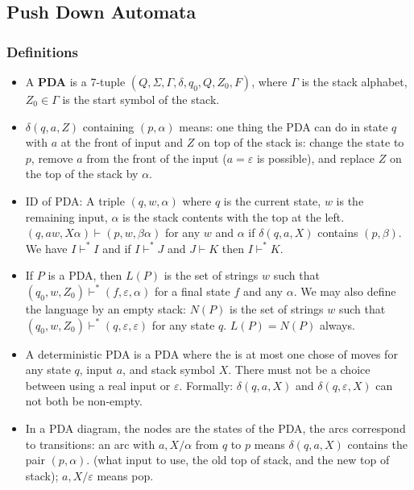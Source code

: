 \subsection{\color{ForestGreen}Push Down Automata}
\subsubsection{Definitions}
\begin{itemize}
\item A \textbf{PDA} is a 7-tuple \( (Q, \Sigma, \Gamma, \delta , q_0, Q, Z_0, F ) \), where \( \Gamma \) is the stack alphabet, \( Z_0 \in \Gamma \) is the start symbol of the stack. 
\item \( \delta (q, a, Z) \) containing \( (p, \alpha) \) means: one thing the PDA can do in state \( q \) with \( a \) at the front of input and \( Z \) on top of the stack is: change the state to \( p \), remove \( a \) from the front of the input (\( a = \varepsilon  \) is possible), and replace \( Z \) on the top of the stack by \( \alpha \).

\item ID of PDA: A triple \( (q, w, \alpha) \) where \( q \) is the current state, \( w \) is the remaining input, \( \alpha \) is the stack contents with the top at the left. \( (q, aw, X\alpha) \vdash (p, w, \beta \alpha) \) for any \( w \) and \( \alpha \) if \( \delta (q, a ,X) \) contains \( (p , \beta) \). We have \( I \vdash^{*} I  \) and if \( I \vdash^{\ast} J \) and \( J \vdash K \) then \( I \vdash^{*} K  \).

\item If \( P \) is a PDA, then \( L(P)  \) is the set of strings \( w \) such that \( (q_0, w, Z_0) \vdash^{*} (f, \varepsilon , \alpha)  \) for a final state \( f \) and any \( \alpha \). We may also define the language by an empty stack: \( N(P) \) is the set of strings \( w \) such that \( (q_0, w , Z_0) \vdash^{*} (q, \varepsilon , \varepsilon ) \) for any state \( q \). \( L(P) = N(P)  \) always.
\item A deterministic PDA is a PDA where the is at most one chose of moves for any state \( q \), input \( a \), and stack symbol \( X \). There must not be a choice between using a real input or \( \varepsilon  \). Formally: \( \delta (q, a , X) \) and \( \delta (q, \varepsilon , X) \) can not both be non-empty.
\item In a PDA diagram, the nodes are the states of the PDA, the arcs correspond to transitions: an arc with \( a , X / \alpha \) from \( q \) to \( p \) means \( \delta (q, a , X) \) contains the pair \( (p, \alpha) \). (what input to use, the old top of stack, and the new top of stack); \( a, X / \varepsilon  \) means pop.
\end{itemize}

